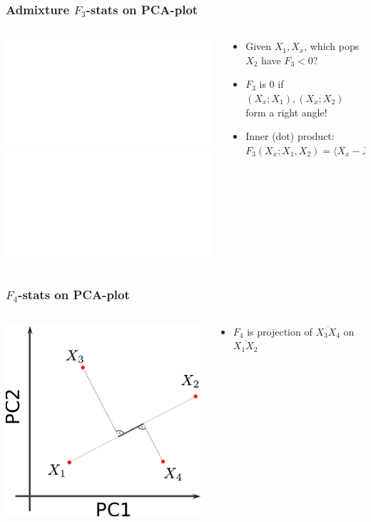 \documentclass[11pt]{beamer}
\begin{document}
\begin{frame}
\frametitle{Admixture $F_3$-stats on PCA-plot}
\begin{columns}
	\begin{column}{0.4\textwidth}
		\includegraphics<1>{figures/f3_on_pca_2b.pdf}
		\includegraphics<2->{figures/f3_on_pca_2.pdf}		
	\end{column}
	\begin{column}{0.6\textwidth}
		\begin{itemize}
			\item<1-> Given $X_1, X_x$, which pops $X_2$ have $F_3 < 0$?	
			\item<2-> $F_3$ is 0 if $(X_x; X_1), (X_x; X_2)$ form a right angle!
			\item<3-> Inner (dot) product: $F_3(X_x; X_1, X_2) = \langle X_x - X_1, X_x - X_2\rangle$
		\end{itemize}		
	\end{column}
\end{columns}
\end{frame}


\begin{frame}
\frametitle{ $F_4$-stats on PCA-plot}
\begin{columns}
	\begin{column}{0.4\textwidth}
		\includegraphics{figures/f4_on_pca.pdf}
	\end{column}
	\begin{column}{0.6\textwidth}
		\begin{itemize}
			\item<1-> $F_4$ is projection of $\overline{X_3X_4}$ on $\overline{X_1X_2}$
		\end{itemize}		
	\end{column}
\end{columns}
\end{frame}
\end{document}
